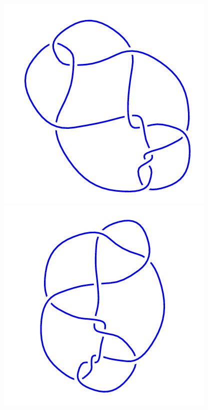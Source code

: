 \begin{figure}[H]
\begin{minipage}[b]{.18\linewidth}
    \end{minipage}
    \begin{minipage}[b]{.18\linewidth}
        \centering
        \includegraphics[width=\linewidth]{../data/10_29.png}
    \end{minipage}
    \begin{minipage}[b]{.18\linewidth}
        \centering
        \includegraphics[width=\linewidth]{../data/10_30.png}

\end{minipage}
\end{figure}
